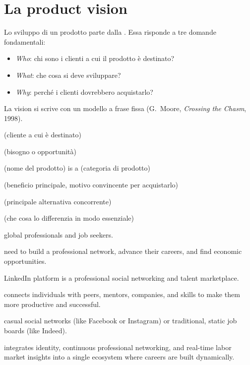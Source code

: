 \section{La product vision}
\label{sec:prodotti-vision}

Lo sviluppo di un prodotto parte dalla . Essa risponde a tre domande fondamentali:
\begin{itemize}
  \item \emph{Who}: chi sono i clienti a cui il prodotto è destinato?
  \item \emph{What}: che cosa si deve sviluppare?
  \item \emph{Why}: perché i clienti dovrebbero acquistarlo?
\end{itemize}

La vision si scrive con un modello a frase fissa (G.~Moore, \emph{Crossing the Chasm}, 1998).

\begin{definizione}
\begin{description}[leftmargin=2.8cm, style=nextline, font=\sffamily\bfseries\small]
  \item[FOR] (cliente a cui è destinato)
  \item[WHO] (bisogno o opportunità)
  \item[THE] (nome del prodotto) is a (categoria di prodotto)
  \item[THAT] (beneficio principale, motivo convincente per acquistarlo)
  \item[UNLIKE] (principale alternativa concorrente)
  \item[OUR PRODUCT] (che cosa lo differenzia in modo essenziale)
\end{description}
\end{definizione}

\begin{esempio}
\begin{description}[leftmargin=2.8cm, style=nextline, font=\sffamily\bfseries\small]
  \item[FOR] global professionals and job seekers.
  \item[WHO] need to build a professional network, advance their careers, and find economic opportunities.
  \item[THE] LinkedIn platform is a professional social networking and talent marketplace.
  \item[THAT] connects individuals with peers, mentors, companies, and skills to make them more productive and
    successful.
  \item[UNLIKE] casual social networks (like Facebook or Instagram) or traditional, static job boards (like Indeed).
  \item[OUR PRODUCT] integrates identity, continuous professional networking, and real-time labor market insights
    into a single ecosystem where careers are built dynamically.
\end{description}
\end{esempio}

